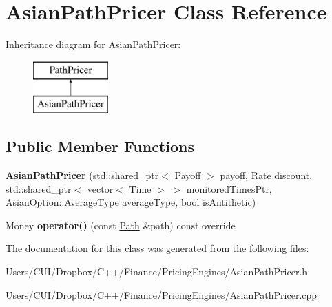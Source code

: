 \hypertarget{class_asian_path_pricer}{}\section{Asian\+Path\+Pricer Class Reference}
\label{class_asian_path_pricer}
Inheritance diagram for Asian\+Path\+Pricer\+:\begin{figure}[H]
\begin{center}
\leavevmode
\includegraphics[height=2.000000cm]{class_asian_path_pricer}
\end{center}
\end{figure}
\subsection*{Public Member Functions}
\begin{DoxyCompactItemize}
\item 
\hypertarget{class_asian_path_pricer_a8e295461d8e635e39d8075810bcc1e6a}{}\label{class_asian_path_pricer_a8e295461d8e635e39d8075810bcc1e6a} 
{\bfseries Asian\+Path\+Pricer} (std\+::shared\+\_\+ptr$<$ \hyperlink{class_payoff}{Payoff} $>$ payoff, Rate discount, std\+::shared\+\_\+ptr$<$ vector$<$ Time $>$ $>$ monitored\+Times\+Ptr, Asian\+Option\+::\+Average\+Type average\+Type, bool is\+Antithetic)
\item 
\hypertarget{class_asian_path_pricer_adb10ce912ab34560d762ce0523ae394e}{}\label{class_asian_path_pricer_adb10ce912ab34560d762ce0523ae394e} 
Money {\bfseries operator()} (const \hyperlink{class_path}{Path} \&path) const override
\end{DoxyCompactItemize}


The documentation for this class was generated from the following files\+:\begin{DoxyCompactItemize}
\item 
Users/\+C\+U\+I/\+Dropbox/\+C++/\+Finance/\+Pricing\+Engines/Asian\+Path\+Pricer.\+h\item 
Users/\+C\+U\+I/\+Dropbox/\+C++/\+Finance/\+Pricing\+Engines/Asian\+Path\+Pricer.\+cpp\end{DoxyCompactItemize}

